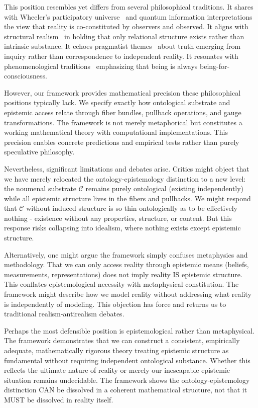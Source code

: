 \documentclass[11pt]{article}
\begin{document}
This position resembles yet differs from several philosophical traditions. It shares with Wheeler's participatory universe~\cite{Wheeler1990} and quantum information interpretations~\cite{Zeilinger1999,Fuchs2013} the view that reality is co-constituted by observers and observed. It aligns with structural realism~\cite{Ladyman2007,Worrall1989} in holding that only relational structure exists rather than intrinsic substance. It echoes pragmatist themes~\cite{James1907,Dewey1938} about truth emerging from inquiry rather than correspondence to independent reality. It resonates with phenomenological traditions~\cite{Husserl1913,Heidegger1927} emphasizing that being is always being-for-consciousness.

However, our framework provides mathematical precision these philosophical positions typically lack. We specify exactly how ontological substrate and epistemic access relate through fiber bundles, pullback operations, and gauge transformations. The framework is not merely metaphorical but constitutes a working mathematical theory with computational implementations. This precision enables concrete predictions and empirical tests rather than purely speculative philosophy.

Nevertheless, significant limitations and debates arise. Critics might object that we have merely relocated the ontology-epistemology distinction to a new level: the noumenal substrate $\mathcal{C}$ remains purely ontological (existing independently) while all epistemic structure lives in the fibers and pullbacks. We might respond that $\mathcal{C}$ without induced structure is so thin ontologically as to be effectively nothing - existence without any properties, structure, or content. But this response risks collapsing into idealism, where nothing exists except epistemic structure.

Alternatively, one might argue the framework simply confuses metaphysics and methodology. That we can only access reality through epistemic means (beliefs, measurements, representations) does not imply reality IS epistemic structure. This conflates epistemological necessity with metaphysical constitution. The framework might describe how we model reality without addressing what reality is independently of modeling. This objection has force and returns us to traditional realism-antirealism debates.

Perhaps the most defensible position is epistemological rather than metaphysical. The framework demonstrates that we can construct a consistent, empirically adequate, mathematically rigorous theory treating epistemic structure as fundamental without requiring independent ontological substance. Whether this reflects the ultimate nature of reality or merely our inescapable epistemic situation remains undecidable. The framework shows the ontology-epistemology distinction CAN be dissolved in a coherent mathematical structure, not that it MUST be dissolved in reality itself.
\end{document}
